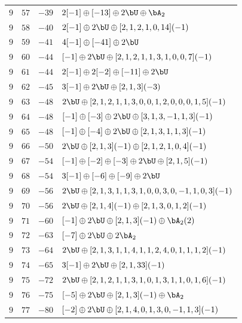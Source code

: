 \begin{center}
\begin{longtable}{llll}
 \(9\) & \(57\) & \(-39\) & \(2 [-1] \oplus [-13] \oplus 2 \bU \oplus \bA_{2}\) \\
 \(9\) & \(58\) & \(-40\) & \(2 [-1] \oplus 2 \bU \oplus [2, 1, 2, 1, 0, 14](-1)\) \\
 \(9\) & \(59\) & \(-41\) & \(4 [-1] \oplus [-41] \oplus 2 \bU\) \\
 \(9\) & \(60\) & \(-44\) & \([-1] \oplus 2 \bU \oplus [2, 1, 2, 1, 1, 3, 1, 0, 0, 7](-1)\) \\
 \(9\) & \(61\) & \(-44\) & \(2 [-1] \oplus 2 [-2] \oplus [-11] \oplus 2 \bU\) \\
 \(9\) & \(62\) & \(-45\) & \(3 [-1] \oplus 2 \bU \oplus [2, 1, 3](-3)\) \\
 \(9\) & \(63\) & \(-48\) & \(2 \bU \oplus [2, 1, 2, 1, 1, 3, 0, 0, 1, 2, 0, 0, 0, 1, 5](-1)\) \\
 \(9\) & \(64\) & \(-48\) & \([-1] \oplus [-3] \oplus 2 \bU \oplus [3, 1, 3, -1, 1, 3](-1)\) \\
 \(9\) & \(65\) & \(-48\) & \([-1] \oplus [-4] \oplus 2 \bU \oplus [2, 1, 3, 1, 1, 3](-1)\) \\
 \(9\) & \(66\) & \(-50\) & \(2 \bU \oplus [2, 1, 3](-1) \oplus [2, 1, 2, 1, 0, 4](-1)\) \\
 \(9\) & \(67\) & \(-54\) & \([-1] \oplus [-2] \oplus [-3] \oplus 2 \bU \oplus [2, 1, 5](-1)\) \\
 \(9\) & \(68\) & \(-54\) & \(3 [-1] \oplus [-6] \oplus [-9] \oplus 2 \bU\) \\
 \(9\) & \(69\) & \(-56\) & \(2 \bU \oplus [2, 1, 3, 1, 1, 3, 1, 0, 0, 3, 0, -1, 1, 0, 3](-1)\) \\
 \(9\) & \(70\) & \(-56\) & \(2 \bU \oplus [2, 1, 4](-1) \oplus [2, 1, 3, 0, 1, 2](-1)\) \\
 \(9\) & \(71\) & \(-60\) & \([-1] \oplus 2 \bU \oplus [2, 1, 3](-1) \oplus \bA_{2}(2)\) \\
 \(9\) & \(72\) & \(-63\) & \([-7] \oplus 2 \bU \oplus 2 \bA_{2}\) \\
 \(9\) & \(73\) & \(-64\) & \(2 \bU \oplus [2, 1, 3, 1, 1, 4, 1, 1, 2, 4, 0, 1, 1, 1, 2](-1)\) \\
 \(9\) & \(74\) & \(-65\) & \(3 [-1] \oplus 2 \bU \oplus [2, 1, 33](-1)\) \\
 \(9\) & \(75\) & \(-72\) & \(2 \bU \oplus [2, 1, 2, 1, 1, 3, 1, 0, 1, 3, 1, 1, 0, 1, 6](-1)\) \\
 \(9\) & \(76\) & \(-75\) & \([-5] \oplus 2 \bU \oplus [2, 1, 3](-1) \oplus \bA_{2}\) \\
 \(9\) & \(77\) & \(-80\) & \([-2] \oplus 2 \bU \oplus [2, 1, 4, 0, 1, 3, 0, -1, 1, 3](-1)\) \\

\end{longtable}
\end{center}

